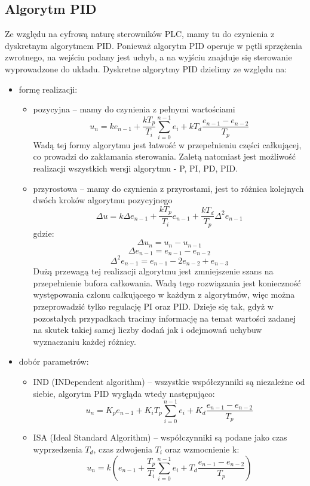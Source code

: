 \documentclass[a4paper, 12pt]{article}
\begin{document}
		\subsection{Algorytm PID}
			Ze względu na cyfrową naturę sterowników PLC, mamy tu do czynienia z dyskretnym algorytmem PID. Ponieważ algorytm PID operuje w pętli sprzężenia zwrotnego, na wejściu podany jest uchyb, a na wyjściu znajduje się sterowanie wyprowadzone do układu. Dyskretne algorytmy PID dzielimy ze względu na:
			\begin{itemize}
				\item formę realizacji:
					\begin{itemize}
						\item pozycyjna -- mamy do czynienia z pełnymi wartościami
							$$
								u_n = ke_{n-1} + \frac{kT_p}{T_i} \sum_{i=0}^{n-1}e_i + kT_d \frac{e_{n-1} - e_{n-2}}{T_p}
							$$
							Wadą tej formy algorytmu jest łatwość w przepełnieniu części całkującej, co prowadzi do zakłamania sterowania. Zaletą natomiast jest możliwość realizacji wszystkich wersji algorytmu - P, PI, PD, PID.
						\item przyrostowa -- mamy do czynienia z przyrostami, jest to różnica kolejnych dwóch kroków algorytmu pozycyjnego
							$$
								\Delta u = k \Delta e_{n-1} + \frac{kT_p}{T_i} e_{n-1} + \frac{kT_d}{T_p} \Delta^2e_{n-1}
							$$
							gdzie:
							$$
								\Delta u_n = u_n - u_{n-1}
							$$
							$$
								\Delta e_{n-1} = e_{n-1} - e_{n-2}
							$$
							$$
								\Delta^2e_{n-1} = e_{n-1} - 2e_{n-2} + e_{n-3}
							$$
							Dużą przewagą tej realizacji algorytmu jest zmniejszenie szans na przepełnienie bufora całkowania. Wadą tego rozwiązania jest konieczność występowania członu całkującego w każdym z algorytmów, więc można przeprowadzić tylko regulację PI oraz PID. Dzieje się tak, gdyż w pozostałych przypadkach tracimy informację na temat wartości zadanej na skutek takiej samej liczby dodań jak i odejmowań uchybu\linebreak w wyznaczaniu każdej różnicy.
							
					\end{itemize}
				\item dobór parametrów:
					\begin{itemize}
						\item IND (INDependent algorithm) -- wszystkie współczynniki są niezależne od siebie, algorytm PID wygląda wtedy następująco:
							$$
								u_n = K_pe_{n-1} + K_iT_p \sum_{i=0}^{n-1}e_i + K_d \frac{e_{n-1} - e_{n-2}}{T_p}
							$$						
						\item ISA (Ideal Standard Algorithm) -- współczynniki są podane jako czas wyprzedzenia $T_d$, czas zdwojenia $T_i$ oraz wzmocnienie k:
							$$
								u_n = k\left(e_{n-1} + \frac{T_p}{T_i} \sum_{i=0}^{n-1}e_i + T_d \frac{e_{n-1} - e_{n-2}}{T_p}\right)
							$$	
					\end{itemize}
			\end{itemize}
			
\end{document}
